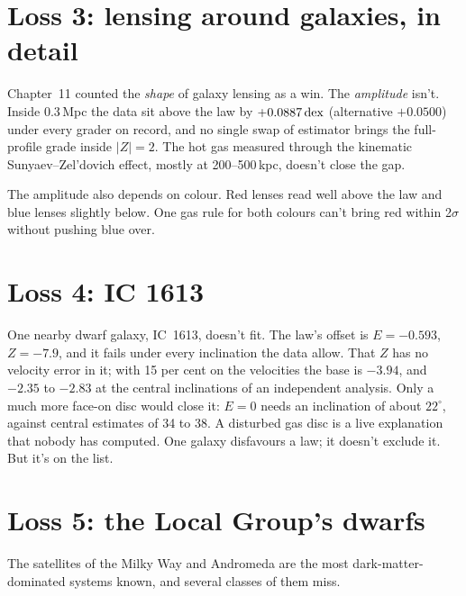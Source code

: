 \section{Loss 3: lensing around galaxies, in detail}

Chapter~11 counted the \emph{shape} of galaxy lensing as a win. The \emph{amplitude} isn't. Inside 0.3\,Mpc the data sit above the law by $+0.0887\,\mathrm{dex}$ (alternative $+0.0500$) under every grader on record, and no single swap of estimator brings the full-profile grade inside $|Z|=2$. The hot gas measured through the kinematic Sunyaev--Zel'dovich effect, mostly at 200--500\,kpc, doesn't close the gap.

The amplitude also depends on colour. Red lenses read well above the law and blue lenses slightly below. One gas rule for both colours can't bring red within 2$\sigma$ without pushing blue over.


\section{Loss 4: IC 1613}

One nearby dwarf galaxy, IC~1613, doesn't fit. The law's offset is $E=-0.593$, $Z=-7.9$, and it fails under every inclination the data allow. That $Z$ has no velocity error in it; with 15 per cent on the velocities the base is $-3.94$, and $-2.35$ to $-2.83$ at the central inclinations of an independent analysis. Only a much more face-on disc would close it: $E=0$ needs an inclination of about $22^\circ$, against central estimates of 34 to 38. A disturbed gas disc is a live explanation that nobody has computed. One galaxy disfavours a law; it doesn't exclude it. But it's on the list.

\section{Loss 5: the Local Group's dwarfs}

The satellites of the Milky Way and Andromeda are the most dark-matter-dominated systems known, and several classes of them miss.


